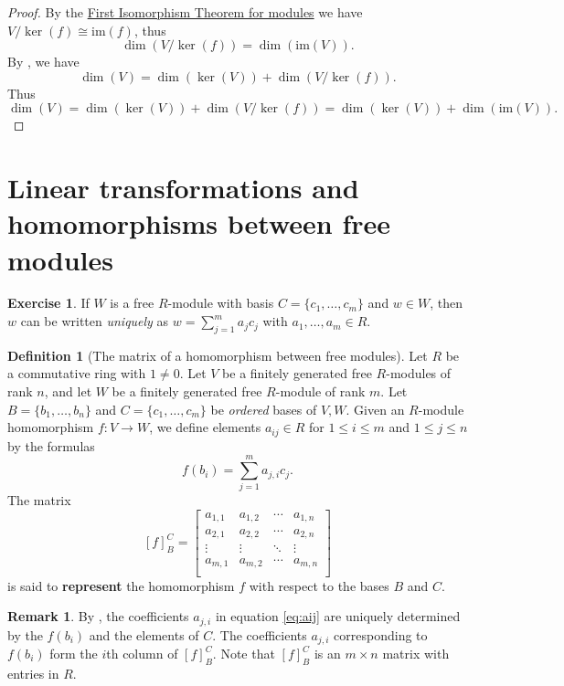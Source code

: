 \documentclass[12pt]{report}
\numberwithin{equation}{section}
\numberwithin{theorem}{chapter}
\theoremstyle{definition}
\newtheorem{definition}[theorem]{Definition}
\newtheorem{exercise}{Exercise}
\newtheorem*{basic properties}{Basic Properties}
\newtheorem*{Important Remark}{Important Remark}
\newtheorem{remark}[theorem]{Remark}
\newcommand{\df}[1]{{\bf #1}\index{#1}}
\renewcommand{\ker}{\operatorname{ker}}
\begin{document}
\begin{proof}
 By the \hyperref[first iso thm]{First Isomorphism Theorem for modules} we have $V/\ker(f)\cong\mathrm{im}(f)$, thus 
 $$\dim\left(V/\ker(f)\right)=\dim(\mathrm{im}(V)).$$ 
 By , we have 
 $$\dim(V)=\dim(\ker(V))+\dim\left(V/\ker(f)\right).$$
 Thus
$$\dim(V)=\dim(\ker(V))+\dim\left(V/\ker(f)\right) = \dim(\ker(V)) + \dim(\mathrm{im}(V)).$$ 
\end{proof}




 
\section{Linear transformations and homomorphisms between free modules}


\begin{exercise}\label{lem:uniqueaij}
If $W$ is a free $R$-module with basis $C=\{c_1, \dots, c_m\}$ and $w\in W$, then $w$ can be written {\em uniquely} as $w=\sum_{j=1}^m a_j c_j$ with $a_1,\ldots, a_m\in R$.
\end{exercise}


\begin{definition}[The matrix of a homomorphism between free modules] 
Let $R$ be a commutative ring with $1\neq 0$.
Let $V$ be a finitely generated free $R$-modules of rank $n$, and let $W$ be a finitely generated free $R$-module of rank $m$. Let $B=\{b_1, \dots, b_n\}$ and $C=\{c_1, \dots, c_m\}$ be {\em ordered} bases of $V,W$. 
Given an $R$-module homomorphism $f: V \to W$, we define elements $a_{ij}\in R$ for $1 \leqslant i \leqslant m$ and $1 \leqslant j \leqslant n$ by the formulas
\begin{equation}\label{eq:aij}
f(b_i) = \sum_{j=1}^m a_{j,i} c_j. 
\end{equation}
The matrix
$$[f]_B^C= 
\begin{bmatrix}
a_{1,1} & a_{1,2} & \cdots & a_{1,n} \\
a_{2,1} & a_{2,2} & \cdots & a_{2,n} \\
\vdots & \vdots & \ddots & \vdots \\
a_{m,1} & a_{m,2} & \cdots & a_{m,n} \\
\end{bmatrix}$$
is said to \df{represent} the homomorphism $f$ with respect to the bases $B$ and $C$.
\end{definition}

\begin{remark}
By , the coefficients $a_{j,i}$ in equation \ref{eq:aij} are uniquely determined by the $f(b_i)$ and the elements of $C$. 
The coefficients $a_{j,i}$  corresponding to $f(b_i)$ form the $i$th column of $[f]_B^C$.
Note that $[f]_B^C$ is an $m\times n$ matrix with entries in $R$.
\end{remark}
\end{document}
